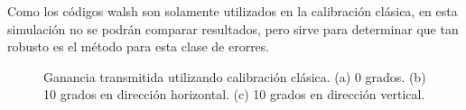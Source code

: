 Como los códigos walsh son solamente utilizados en la calibración clásica, en esta simulación no se podrán comparar 
resultados, pero sirve para determinar que tan robusto es el método para esta clase de erorres.
\begin{figure}[H]
	\centering
 	
		\caption{Ganancia transmitida utilizando calibración clásica. (a) 0 grados. (b) 10 grados en 
		dirección horizontal. (c) 10 grados en dirección vertical.}
	\label{fig:wallErrClassical}
\end{figure}
